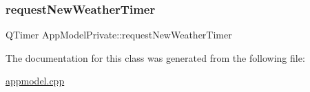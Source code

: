\subsubsection{\texorpdfstring{request\+New\+Weather\+Timer}{requestNewWeatherTimer}}
{\footnotesize\ttfamily Q\+Timer App\+Model\+Private\+::request\+New\+Weather\+Timer}



The documentation for this class was generated from the following file\+:\begin{DoxyCompactItemize}
\item 
\hyperlink{appmodel_8cpp}{appmodel.\+cpp}\end{DoxyCompactItemize}
